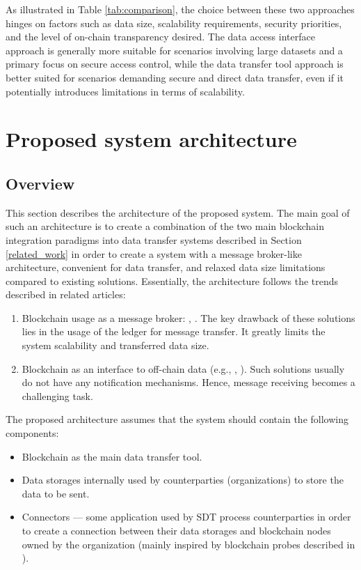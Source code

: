 \documentclass[10pt]{llncs}
\begin{document}
As illustrated in Table \ref{tab:comparison}, the choice between these two approaches hinges on factors such as data size, scalability requirements, security priorities, 
and the level of on-chain transparency desired. 
The data access interface approach is generally more suitable for scenarios involving large datasets and a primary focus on secure access control, while the data transfer tool 
approach is better suited for scenarios demanding secure and direct data transfer, even if it potentially introduces limitations in terms of scalability.

\section{Proposed system architecture} \label{architecture}

\subsection{Overview}

This section describes the architecture of the proposed system.
The main goal of such an architecture is to create a combination of the two main blockchain integration paradigms into data transfer systems described in Section \ref{related_work}
in order to create a system with a message broker-like architecture, convenient for data transfer, and relaxed data size limitations compared to existing solutions.
Essentially, the architecture follows the trends described in related articles:

\begin{enumerate}
    \item Blockchain usage as a message broker: \cite{Ghaemi2021}, \cite{kim2020hybrid}. 
    The key drawback of these solutions lies in the usage of the ledger for message transfer.
    It greatly limits the system scalability and transferred data size. 
    \item Blockchain as an interface to off-chain data (e.g., \cite{Jia2023}, \cite{Wang2024}).
    Such solutions usually do not have any notification mechanisms.
    Hence, message receiving becomes a challenging task.
\end{enumerate}

The proposed architecture assumes that the system should contain the following components:

\begin{itemize}
    \item Blockchain as the main data transfer tool. 
    \item Data storages internally used by counterparties (organizations) to store the data to be sent.
    \item Connectors --- some application used by SDT process counterparties in order to create a connection between their data storages
    and blockchain nodes owned by the organization (mainly inspired by blockchain probes described in \cite{Jia2023}).
\end{itemize}
\end{document}

